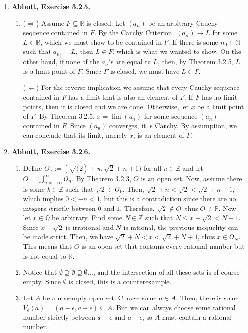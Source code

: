 \documentclass{article}
\newcommand{\N}{\mathbb{N}}
\newcommand{\Z}{\mathbb{Z}}
\newcommand{\Q}{\mathbb{Q}}
\newcommand{\R}{\mathbb{R}}
\newcommand{\ra}{\rightarrow}
\newcommand{\exc}[2][Abbott]{\item \textbf{#1, Exercise #2.}}
\begin{document}
\begin{enumerate}
    \exc{3.2.5}
    \begin{enumerate}
        \item ($\Rightarrow$) Assume $F \subseteq \R$ is closed. Let $(a_n)$ be an arbitrary Cauchy sequence contained in $F$. By the Cauchy Criterion, $(a_n) \ra L$ for some $L \in \R$, which we must show to be contained in $F$. If there is some $n_0 \in \N$ such that $a_{n_0} = L$, then $L \in F$, which is what we wanted to show. On the other hand, if none of the $a_n'$s are equal to $L$, then, by Theorem 3.2.5, $L$ is a limit point of $F$. Since $F$ is closed, we must have $L \in F$.
        
        ($\Leftarrow$) For the reverse implication we assume that every Cauchy sequence contained in $F$ has a limit that is also an element of $F$. If $F$ has no limit points, then it is closed and we are done. Otherwise, let $x$ be a limit point of $F$. By Theorem 3.2.5, $x = \lim(a_n)$ for some sequence $(a_n)$ contained in $F$. Since $(a_n)$ converges, it is Cauchy. By assumption, we can conclude that its limit, namely $x$, is an element of $F$.
    \end{enumerate}
    
    \exc{3.2.6}
    \begin{enumerate}
        \item Define $O_n := (\sqrt(2)+n,\sqrt{2}+n+1)$ for all $n \in \Z$ and let $O = \bigcup_{n=-\infty}^\infty O_n$. By Theorem 3.2.3, $O$ is an open set. Now, assume there is some $k \in \Z$ such that $\sqrt{2} \in O_k$. Then, $\sqrt{2}+n<\sqrt{2} < \sqrt{2}+n+1$, which implies $0 < -n < 1$, but this is a contradiction since there are no integers strictly between $0$ and $1$. Therefore, $\sqrt{2} \notin O$, thus $O \neq \R$. Now let $x \in \Q$ be arbitrary. Find some $N \in \Z$ such that $N \leq x-\sqrt{2} < N+1$. Since $x-\sqrt{2}$ is irrational and $N$ is rational, the previous inequality can be made strict. Then, we have $\sqrt{2} + N < x < \sqrt{2} + N + 1$, thus $x \in O_N$. This means that $O$ is an open set that contains every rational number but is not equal to $\R$.
        
        \item Notice that $\emptyset \supseteq \emptyset \supseteq \emptyset \dots$, and the intersection of all these sets is of course empty. Since $\emptyset$ is closed, this is a counterexample.
        
        \item Let $A$ be a nonempty open set. Choose some $a \in A$. Then, there is some $V_\epsilon(a) = (a-\epsilon, a+\epsilon) \subseteq A$. But we can always choose some rational number strictly between $a-\epsilon$ and $a + \epsilon$, so $A$ must contain a rational number.
        

\end{enumerate}
\end{enumerate}
\end{document}
